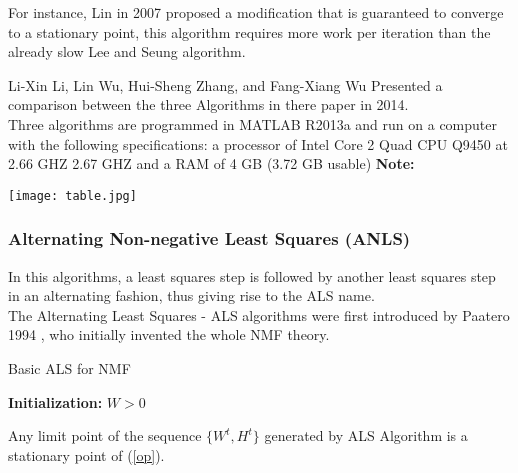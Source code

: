 \documentclass[aspectratio=169]{beamer}
\begin{document}
    \begin{frame}
    For instance, Lin in 2007 proposed a modification that is guaranteed to converge to a stationary point,
    this algorithm requires more work per iteration than the already slow Lee and Seung algorithm.
\end{frame}
\begin{frame}
        Li-Xin Li, Lin Wu, Hui-Sheng Zhang, and Fang-Xiang Wu Presented a comparison between the three Algorithms
        in there paper in 2014.\\
        Three algorithms are programmed in MATLAB R2013a and run on a computer with the following specifications: 
        a processor of Intel Core 2 Quad CPU Q9450 at 2.66 GHZ 2.67 GHZ and a RAM of 4 GB (3.72 GB usable)
        \textbf{Note:}\\ 
\end{frame}
\begin{frame}
    \texttt{[image: table.jpg]}
\end{frame}
\begin{frame}
    \frametitle{Alternating Non-negative Least Squares (ANLS)}
    In this algorithms, a least squares step is followed by another least squares step in an alternating fashion, thus giving rise to the ALS name.\\
    The Alternating Least Squares - ALS algorithms were first introduced by Paatero 1994 , 
    who initially invented the whole NMF theory.
    \begin{algorithm}[H]
        \caption{Basic ALS for NMF}
        \textbf{Initialization:} $W > 0$\;
    \end{algorithm}
\end{frame}
\begin{frame}
    \begin{theorem}
        Any limit point of the sequence $\{W^{t} , H^{t}\}$ generated by ALS Algorithm  is a stationary point of (\ref{op}).
    \end{theorem}
    \end{frame}
\end{document}
